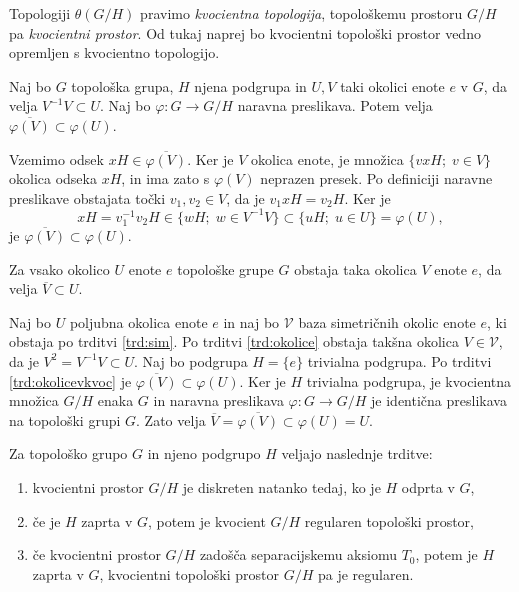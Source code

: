 \documentclass[mat1]{fmfdelo}
\newcommand{\closure}[1]{\overline{#1}}
\begin{document}
Topologiji $\theta(G/H)$ pravimo \emph{kvocientna topologija}, topološkemu prostoru $G/H$ pa \emph{kvocientni prostor}. Od tukaj naprej bo kvocientni topološki prostor vedno opremljen s kvocientno topologijo.

\begin{trditev}\label{trd:okolicevkvoc}
Naj bo $G$ topološka grupa, $H$ njena podgrupa in $U, V$ taki okolici enote $e$ v $G$, da velja $V^{-1}V \subset U$. Naj bo $\varphi: G \to G/H$ naravna preslikava. Potem velja $\closure{\varphi(V)} \subset \varphi(U)$.
\end{trditev}

\begin{dokaz}
Vzemimo odsek $xH \in \closure{\varphi(V)}$. Ker je $V$ okolica enote, je množica $\lbrace vxH ;\; v \in V \rbrace$ okolica odseka $xH$, in ima zato s $\varphi(V)$ neprazen presek. Po definiciji naravne preslikave obstajata točki $v_1, v_2 \in V$, da je $v_1xH = v_2H$. Ker je \[xH = v_1^{-1}v_2H \in \lbrace wH ;\; w \in V^{-1}V \rbrace \subset \lbrace uH ;\; u \in U \rbrace = \varphi(U), \]
je $\closure{\varphi(V)} \subset \varphi(U)$.
\end{dokaz}

\begin{posledica}\label{pos:sim}
Za vsako okolico $U$ enote $e$ topološke grupe $G$ obstaja taka okolica $V$ enote $e$, da velja $\closure{V} \subset U$.
\end{posledica}

\begin{dokaz}
Naj bo $U$ poljubna okolica enote $e$ in naj bo $\mathcal{V}$ baza simetričnih okolic enote $e$, ki obstaja po trditvi \ref{trd:sim}. Po trditvi \ref{trd:okolice} obstaja takšna okolica $V \in \mathcal{V}$, da je $V^2 = V^{-1}V \subset U$. Naj bo podgrupa $H = \lbrace e \rbrace$ trivialna podgrupa. Po trditvi \ref{trd:okolicevkvoc} je $\closure{\varphi(V)} \subset \varphi(U)$. Ker je $H$ trivialna podgrupa, je kvocientna množica $G/H$ enaka $G$ in naravna preslikava $\varphi\colon G \to G/H$ je identična preslikava na topološki grupi $G$. Zato velja $\closure{V} = \closure{\varphi(V)} \subset \varphi(U) = U$.
\end{dokaz}

\begin{izrek}\label{izr:kvocreg}
Za topološko grupo $G$ in njeno podgrupo $H$ veljajo naslednje trditve:
\begin{enumerate}
\item kvocientni prostor $G/H$ je diskreten natanko tedaj, ko je $H$ odprta v $G$,\label{podtrd:kvocreg1}
\item če je $H$ zaprta v $G$, potem je kvocient $G/H$ regularen topološki prostor,\label{podtrd:kvocreg2}
\item če kvocientni prostor $G/H$ zadošča separacijskemu aksiomu $T_0$, potem je $H$ zaprta v $G$, kvocientni topološki prostor $G/H$ pa je regularen.\label{podtrd:kvocreg3}
\end{enumerate}
\end{izrek}
\end{document}
